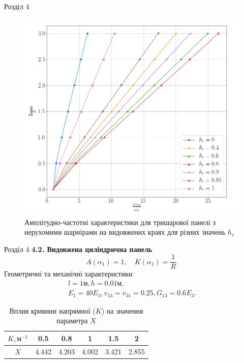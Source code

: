 \documentclass[8pt]{beamer}
\numberwithin{figure}{section}
\numberwithin{equation}{section}
\numberwithin{table}{section}
\begin{document}
\begin{frame}{Розділ 4}

\begin{figure}
	\includegraphics[scale=0.2]{pic/AFR_layered2.png}
		\caption{Амплітудно-частотні характеристики для тришарової панелі з нерухомими шарнірами на видовжених краях для різних значень $h_{r}$}
		\label{fig:AFR_layers}
\end{figure}


\end{frame}

\begin{frame}{Розділ 4}
\textbf{4.2. Видовжена циліндрична панель}
\begin{equation}
A\left( \alpha_1 \right)=1, \quad K\left( \alpha_1 \right)=\frac{1}{R}.
\end{equation}
Геометричні та механічні характеристики
\begin{equation}
\begin{gathered}
l=1\text{м}, h=0.01\text{м},\\
E_1=40E_3, v_{13}=v_{31}=0.25, G_{13}=0.6E_3.
\end{gathered}
\end{equation}

\begin{table}[h!]
\caption{Вплив кривини напрямної ($K$) на значення параметра $X$}
\centering
 \begin{tabular}{| c | c | c | c | c | c |} 
 \hline
 $K, м^{-1}$ & 0.5 & 0.8 & 1 & 1.5 & 2 \\ 
  \hline
 $X$ & 4.442 & 4.203 & 4.002 & 3.421 & 2.855 \\
   \hline
\end{tabular}
\end{table}
\end{frame}
\end{document}
